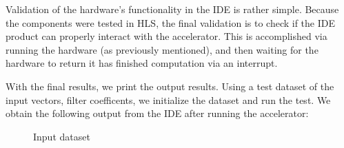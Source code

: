 \documentclass[11pt]{report}
\begin{document}
Validation of the hardware's functionality in the IDE is rather simple. Because the components were tested in HLS, the final validation is to check if the IDE product can properly interact with the accelerator. This is accomplished via running the hardware (as previously mentioned), and then waiting for the hardware to return it has finished computation via an interrupt. 

With the final results, we print the output results. Using a test dataset of the input vectors, filter coefficents, we initialize the dataset and run the test. We obtain the following output from the IDE after running the accelerator:


\begin{figure}[h!]
 	\begin{center}
 		\fboxsep=0mm
 		\caption{Input dataset}
 		\label{fig:inputResults}
 	\end{center}
 \end{figure}
 \FloatBarrier
 
\end{document}
